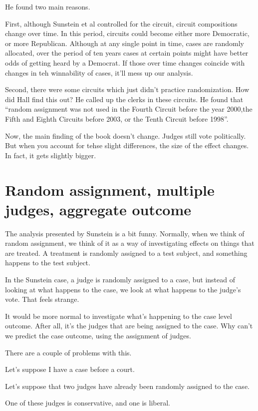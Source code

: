 \documentclass[12pt,twoside]{article}
\begin{document}
He found two main reasons.

First, although Sunstein et al controlled for the circuit, circuit
compositions change over time. In this period, circuits could become
either more Democratic, or more Republican. Although at any single point
in time, cases are randomly allocated, over the period of ten years
cases at certain points might have better odds of getting heard by a
Democrat. If those over time changes coincide with changes in teh
winnability of cases, it'll mess up our analysis.

Second, there were some circuits which just didn't practice
randomization. How did Hall find this out? He called up the clerks in
these circuits. He found that ``random assignment was not used in the
Fourth Circuit before the year 2000,the Fifth and Eighth Circuits before
2003, or the Tenth Circuit before 1998''.

Now, the main finding of the book doesn't change. Judges still vote
politically. But when you account for tehse slight differences, the size
of the effect changes. In fact, it gets slightly bigger.

\section{Random assignment, multiple judges, aggregate
outcome}\label{random-assignment-multiple-judges-aggregate-outcome}

The analysis presented by Sunstein is a bit funny. Normally, when we
think of random assignment, we think of it as a way of investigating
effects on things that are treated. A treatment is randomly assigned to
a test subject, and something happens to the test subject.

In the Sunstein case, a judge is randomly assigned to a case, but
instead of looking at what happens to the case, we look at what happens
to the judge's vote. That feels strange.

It would be more normal to investigate what's happening to the case
level outcome. After all, it's the judges that are being assigned to the
case. Why can't we predict the case outcome, using the assignment of
judges.

There are a couple of problems with this.

Let's suppose I have a case before a court.

Let's suppose that two judges have already been randomly assigned to the
case.

One of these judges is conservative, and one is liberal.
\end{document}
